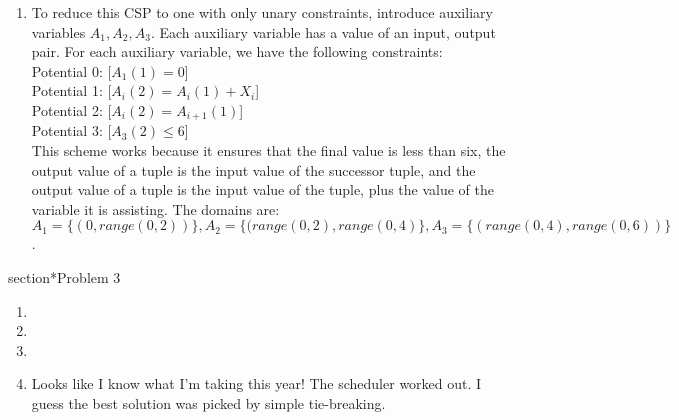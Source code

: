 \documentclass[12pt]{article}
\begin{document}
\begin{enumerate}[label=(\alph*)]
  \item To reduce this CSP to one with only unary constraints, introduce auxiliary variables $A_1, A_2, A_3$. Each auxiliary variable has a value of an input, output pair. For each auxiliary variable, we have the following constraints:\\
  Potential 0: [$A_1(1) = 0$] \\
  Potential 1: [$A_i(2) = A_i(1) + X_i$] \\
  Potential 2: [$A_i(2) = A_{i+1}(1)$]\\
  Potential 3: [$A_3(2) \leq 6$] \\
  This scheme works because it ensures that the final value is less than six, the output value of a tuple is the input value of the successor tuple, and the output value of a tuple is the input value of the tuple, plus the value of the variable it is assisting. The domains are: $A_1 = \{(0, range(0,2))\}, A_2 = \{(range(0, 2), range(0, 4)\}, A_3 = \{(range(0, 4), range(0, 6))\}$.
  
\end{enumerate}

section*{Problem 3}

\begin{enumerate}[label=(\alph*)]
\item
\item
\item
\item Looks like I know what I'm taking this year! The scheduler worked out. I guess the best solution was picked by simple tie-breaking.

\end{enumerate}
\end{document}
